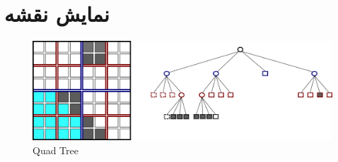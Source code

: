 \section{نمایش نقشه}
\begin{figure}[H]
  \includegraphics[width = \textwidth]{images/quad_tree.png}
  \caption{Quad Tree}
  \label{fig:carbon}
\end{figure}